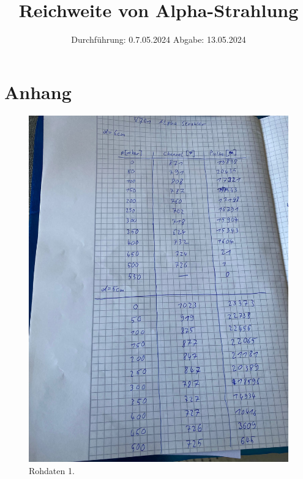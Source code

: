 

\subject{V701}
\title{Reichweite von Alpha-Strahlung}
\date{%
  Durchführung: 0.7.05.2024
  \hspace{3em}
  Abgabe: 13.05.2024
}



\maketitle
\thispagestyle{empty}
\tableofcontents
\newpage






\printbibliography{}

\section{Anhang}

\begin{figure}[H]
  \includegraphics[width=\textwidth, height=15cm]{Bilder/rohdaten1.jpg}
  \caption{Rohdaten 1.}
\end{figure}

